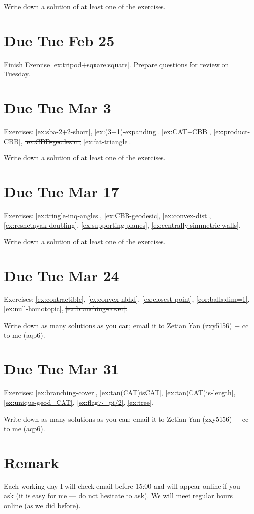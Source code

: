 \noindent Write down a solution of at least one of the exercises.

\section{Due Tue Feb 25}

Finish Exercise \ref{ex:tripod+square:square}.
Prepare questions for review on Tuesday.

\section{Due Tue Mar 3}

Exercises: \ref{ex:sba-2+2-short}, \ref{ex:(3+1)-expanding}, \ref{ex:CAT+CBB}, \ref{ex:product-CBB}, \sout{\ref{ex:CBB-geodesic},} \ref{ex:fat-triangle}.

\noindent Write down a solution of at least one of the exercises.

\section{Due Tue Mar 17}

Exercises: \ref{ex:tringle-inq-angles},
\ref{ex:CBB-geodesic},
\ref{ex:convex-dist},
\ref{ex:reshetnyak-doubling},
\ref{ex:supporting-planes},
\ref{ex:centrally-simmetric-walls}.

\noindent Write down a solution of at least one of the exercises.

\section{Due Tue Mar 24}

Exercises: 
\ref{ex:contractible},
\ref{ex:convex-nbhd},
\ref{ex:closest-point},
\ref{cor:balls:dim=1},
\ref{ex:null-homotopic},
\sout{\ref{ex:branching-cover}.}

 Write down as many solutions as you can; email it to Zetian Yan (zxy5156) + cc to me (aqp6).

\section{Due Tue Mar 31}

Exercises: 
\ref{ex:branching-cover},
\ref{ex:tan(CAT)isCAT},
\ref{ex:tan(CAT)is-length},
\ref{ex:unique-geod=CAT},
\ref{ex:flag>=pi/2},
\ref{ex:tree}.

Write down as many solutions as you can; email it to Zetian Yan (zxy5156) + cc to me (aqp6).

\section*{Remark}
Each working day I will check email before 15:00 and will appear online if you ask (it is easy for me --- do not hesitate to ask).
We will meet regular hours online (as we did before).
